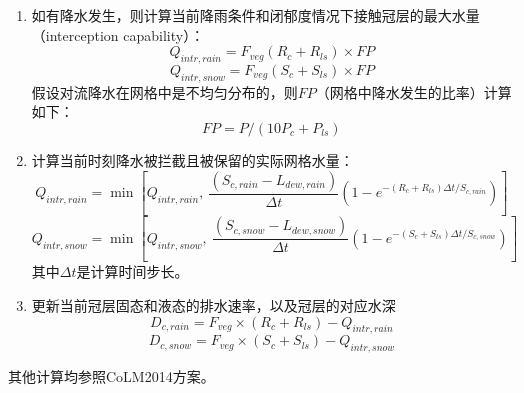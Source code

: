 \begin{enumerate}
\item 如有降水发生，则计算当前降雨条件和闭郁度情况下接触冠层的最大水量（interception capability）：
\begin{equation}
Q_{intr,rain} =F_{veg}\left(R_{c}+R_{ls}\right)\times FP
\end{equation}
\begin{equation}
Q_{intr,snow} =F_{veg}\left(S_{c}+S_{ls}\right)\times FP
\end{equation}
假设对流降水在网格中是不均匀分布的，则$FP$（网格中降水发生的比率）计算如下：
\begin{equation}
FP = P/ (10P_{c} + P_{ls})
\end{equation}
\item 计算当前时刻降水被拦截且被保留的实际网格水量：
\begin{equation}
Q_{intr,rain} = \min\left[Q_{intr,rain}, \ \frac{(S_{c,rain} - L_{dew,rain})}{\Delta{t}}  (1-e^{-\left(R_{c}+R_{ls}\right)\Delta{t}/S_{c,rain}})\right]
\end{equation}
\begin{equation}
Q_{intr,snow} = \min\left[Q_{intr,snow},\ \frac{(S_{c,snow} - L_{dew,snow})}{\Delta{t}} (1-e^{-\left(S_{c}+S_{ls}\right)\Delta{t}/S_{c,snow}})\right]
\end{equation}
其中${\Delta{t}}$是计算时间步长。
\item 更新当前冠层固态和液态的排水速率，以及冠层的对应水深
\begin{equation}
D_{c,rain}=F_{veg} \times (R_{c}+R_{ls})-Q_{intr,rain}
\end{equation}
\begin{equation}
D_{c,snow}=F_{veg} \times (S_{c}+S_{ls})-Q_{intr,snow}
\end{equation}
\end{enumerate}
其他计算均参照CoLM2014方案。


